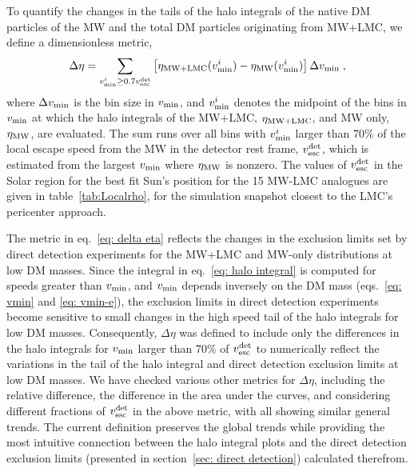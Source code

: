 To quantify the changes in the tails of the halo integrals of the native DM particles of the MW and the total DM particles originating from MW+LMC, we define a dimensionless metric, 
\begin{equation}
\Delta \eta =\sum_{v_{\rm min}^i\geq 0.7 v_{\rm esc}^{\rm det}}\left[\eta_{\rm MW+LMC}(v_{\rm min}^i)-\eta_{\rm MW}(v_{\rm min}^i)\right]\Delta v_{\rm min}\; ,
    \label{eq: delta eta}
\end{equation}
where $\Delta v_{\rm min}$ is the bin size in $v_{\rm min}$, and $v_{\rm min}^i$ denotes the midpoint of the bins in $v_{\rm min}$ at which the halo integrals of the MW+LMC, $\eta_{\rm MW+LMC}$, and MW only, $\eta_{\rm MW}$, are evaluated. The sum runs over all bins with $v_{\rm min}^i$ larger than 70\% of the local escape speed from the MW in the detector rest frame, $v_{\rm esc}^{\rm det}$, which is estimated from the largest $v_{\rm min}$ where $\eta_{\rm MW}$ is nonzero. The values of $v_{\rm esc}^{\rm det}$ in the Solar region for the best fit Sun's position for the 15 MW-LMC analogues are given in table~\ref{tab:Localrho}, for the simulation snapshot closest to the LMC’s pericenter approach.



The metric in eq.~\eqref{eq: delta eta} reflects the changes in the exclusion limits set by direct detection experiments for the MW+LMC and MW-only distributions at low DM masses. Since the integral in eq.~\eqref{eq: halo integral} is computed for speeds greater than $v_{\rm min}$, and $v_{\rm min}$ depends inversely on the DM mass (eqs.~\eqref{eq: vmin} and \eqref{eq: vmin-e}), the exclusion limits in direct detection experiments become sensitive to small changes in the high speed tail of the halo integrals for low DM masses. Consequently, $\Delta\eta$ was defined to include only the differences in the halo integrals for $v_{\rm min}$ larger than 70\% of $v_{\rm esc}^{\rm det}$ to numerically reflect the variations in the tail of the halo integral and direct detection exclusion limits  at low DM masses. 
We have checked various other metrics for $\Delta\eta$, including the relative difference, the difference in the area under the curves, and considering different fractions of $v_{\rm esc}^{\rm det}$ in the above metric, with all showing similar general trends. The current definition 
preserves the global trends while providing the most intuitive connection between the halo integral plots and the direct detection exclusion limits (presented in section~\ref{sec: direct detection}) calculated therefrom.  


